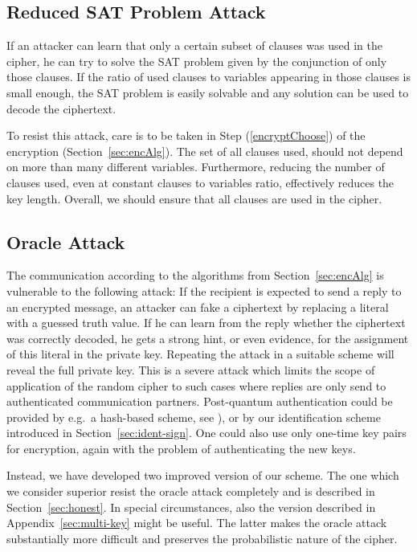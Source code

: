 \documentclass[final,journal,compsoc]{IEEEtran}
\begin{document}
\subsection{Reduced SAT Problem Attack\label{sec:reduced-sat-problem}}

If an attacker can learn that only a certain subset of clauses was used
in the cipher, he can try to solve the SAT problem given by the
conjunction of only those clauses. If the ratio of
used clauses to variables appearing in those clauses is
small enough, the SAT problem is easily solvable and any solution can be used to decode the ciphertext.

To resist this attack, care is to be taken in Step
(\ref{encryptChoose}) of the encryption
(Section~\ref{sec:encAlg}). The set of all clauses used,  should not
depend on more than  many different variables.  Furthermore,
reducing the number of clauses used, even at constant clauses to
variables ratio, effectively reduces the key length. Overall, we
should ensure that all clauses are used in the cipher.

\subsection{Oracle Attack\label{sec:oracle-attack}}
The communication according to the algorithms from
Section~\ref{sec:encAlg}  is vulnerable to the following
attack: If the recipient is expected to send a reply to an encrypted
message, an attacker can fake a ciphertext by replacing a literal with a
guessed truth value. If he can learn from the reply whether the ciphertext
was correctly decoded, he gets a strong hint, or even evidence, for the
assignment of this literal in the private key.  Repeating the attack
in a suitable scheme will reveal the full private key.
This is a severe attack which limits the scope of application of the
random cipher to such cases where replies are
only send to authenticated communication partners. Post-quantum
authentication could be provided by e.g.\ a hash-based scheme,
see \cite[Hash-based Digital Signature Schemes]{BBD09}), or by our
identification scheme introduced in Section~\ref{sec:ident-sign}.
One could also use only one-time key pairs for
encryption, again with the problem of authenticating the new keys.

Instead, we have developed two improved version of our scheme. The one
which we consider superior resist the oracle attack completely and is
described in Section~\ref{sec:honest}.  In special circumstances,
also the version described in Appendix~\ref{sec:multi-key} might
be useful. The latter makes the oracle attack substantially more
difficult and preserves the probabilistic nature of the cipher.
\end{document}
